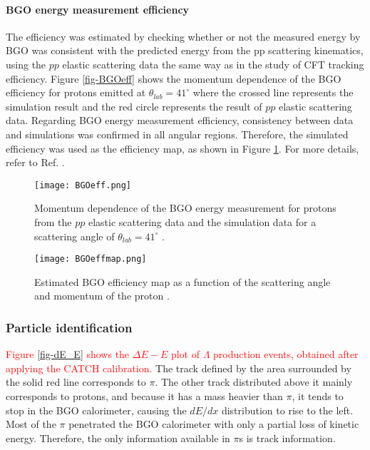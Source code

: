 \vspace{10pt}
\paragraph{BGO energy measurement efficiency }
The efficiency was estimated by checking whether or not the measured energy by BGO was consistent with the predicted energy from the pp scattering kinematics, using the $pp$ elastic scattering data the same way as in the study of CFT tracking efficiency. Figure \ref{fig-BGOeff}  shows the momentum dependence of the
BGO efficiency for protons emitted at $\theta_{lab}=41^{\circ}$ where the crossed line represents the simulation result and the red circle represents the result of $pp$ elastic scattering data. Regarding BGO energy measurement efficiency, consistency between data and simulations was confirmed in all angular regions. Therefore, the simulated efficiency was used as the efficiency map, as shown in Figure \ref{fig-BGOeffmap}. For more details, refer to Ref. \cite{Miwa-SMp}.

\begin{figure}[!h]
  \begin{minipage}[t]{0.48\columnwidth}
    \centering
    \texttt{[image: BGOeff.png]}
    \caption{Momentum dependence of the BGO energy measurement for protons from the $pp$ elastic scattering data and the simulation data for a scattering angle of $\theta_{lab}=41^{\circ}$ \cite{Miwa-SMp}.}
    \label{fig-BGOeff}
  \end{minipage}
  \hspace{0.04\columnwidth} %
  \begin{minipage}[t]{0.48\columnwidth}
    \centering
    \texttt{[image: BGOeffmap.png]}
    \caption{Estimated BGO efficiency map as a function of the scattering angle and momentum of the proton \cite{Miwa-SMp}.}
    \label{fig-BGOeffmap}
  \end{minipage}
\end{figure}

\subsubsection{Particle identification}
\textcolor{red}{ Figure \ref{fig-dE_E} shows the $\Delta E-E$ plot of $\Lambda$ production events, obtained after applying the CATCH calibration. } The track defined by the area surrounded by the solid red line corresponds to $\pi$. The other track distributed above it mainly corresponds to protons, and because it has a mass heavier than $\pi$, it tends to stop in the BGO calorimeter, causing the $dE/dx$ distribution to rise to the left. Most of the $\pi$ penetrated the BGO calorimeter with only a partial loss of kinetic energy. Therefore, the only information available in $\pi$s is track information.

